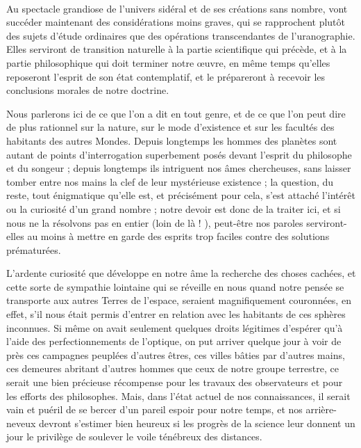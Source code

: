 \documentclass[a4paper, 11pt, oneside, landscape]{article}
\begin{document}
\paragraph{}
Au spectacle grandiose de l'univers sidéral et de ses créations sans nombre, vont succéder maintenant des considérations moins graves, qui se rapprochent plutôt des sujets d'étude ordinaires que des opérations transcendantes de l'uranographie. Elles serviront de transition naturelle à la partie scientifique qui précède, et à la partie philosophique qui doit terminer notre œuvre, en même temps qu'elles reposeront l'esprit de son état contemplatif, et le prépareront à recevoir les conclusions morales de notre doctrine.

Nous parlerons ici de ce que l'on a dit en tout genre, et de ce que l'on peut dire de plus rationnel sur la nature, sur le mode d'existence et sur les facultés des habitants des autres Mondes. Depuis longtemps les hommes des planètes sont autant de points d'interrogation superbement posés devant l'esprit du philosophe et du songeur ; depuis longtemps ils intriguent nos âmes chercheuses, sans laisser tomber entre nos mains la clef de leur mystérieuse existence ; la question, du reste, tout énigmatique qu'elle est, et précisément pour cela, s'est attaché l'intérêt ou la curiosité d'un grand nombre ; notre devoir est donc de la traiter ici, et si nous ne la résolvons pas en entier (loin de là ! ), peut-être nos paroles serviront-elles au moins à mettre en garde des esprits trop faciles contre des solutions prématurées.

L'ardente curiosité que développe en notre âme la recherche des choses cachées, et cette sorte de sympathie lointaine qui se réveille en nous quand notre pensée se transporte aux autres Terres de l'espace, seraient magnifiquement couronnées, en effet, s'il nous était permis d'entrer en relation avec les habitants de ces sphères inconnues. Si même on avait seulement quelques droits légitimes d'espérer qu'à l'aide des perfectionnements de l'optique, on put arriver quelque jour à voir de près ces campagnes peuplées d'autres êtres, ces villes bâties par d'autres mains, ces demeures abritant d'autres hommes que ceux de notre groupe terrestre, ce serait une bien précieuse récompense pour les travaux des observateurs et pour les efforts des philosophes. Mais, dans l'état actuel de nos connaissances, il serait vain et puéril de se bercer d'un pareil espoir pour notre temps, et nos arrière-neveux devront s'estimer bien heureux si les progrès de la science leur donnent un jour le privilège de soulever le voile ténébreux des distances.
\end{document}
